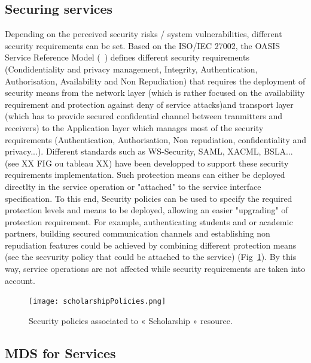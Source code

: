 \documentclass[runningheads,a4paper]{llncs}
\begin{document}
\subsection{Securing services}
Depending on the perceived security risks / system vulnerabilities, different security requirements can be set. Based on the ISO/IEC 27002, the OASIS Service Reference Model (~\cite{OAS06}) defines different security requirements (Condidentiality and privacy management, Integrity, Authentication, Authorisation, Availability and Non Repudiation) that  requires the deployment of security means from the network layer (which is rather focused on the availability requirement and protection against deny of service attacks)and transport layer (which has to provide secured confidential channel between tranmitters and receivers) to the Application layer which manages most of the security requirements (Authentication, Authorisation, Non repudiation, confidentiality and privacy...). Different standards such as WS-Security, SAML, XACML, BSLA...(see XX FIG ou tableau XX) have been developped to support these security requirements implementation.
Such protection means can either be deployed directlty in the service operation or "attached" to the service interface specification. To this end, Security policies can be used to specify the required protection levels and means to be deployed, allowing an easier "upgrading" of protection requirement. 
For example, authenticating students and or academic partners, building secured communication channels and establishing non repudiation features could be achieved by combining different protection means (see the secvurity policy that could be attached to the service) (Fig~\ref{fig:policy}). By this way, service operations are not affected while security requirements are taken into account.

\begin{figure}  
\centering
\texttt{[image: scholarshipPolicies.png]}
\caption{Security policies associated to « Scholarship » resource.}
\label{fig:policy}
\end{figure}


\subsection{MDS for Services}
\end{document}
